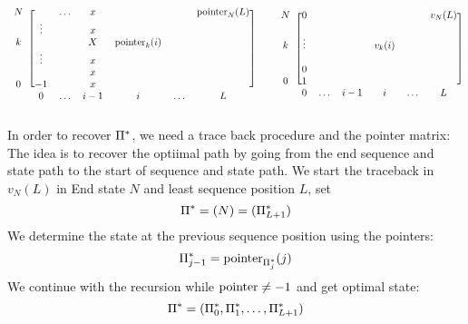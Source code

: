 \begin{definition}
\[
\begin{blockarray}{ccccccc}
\begin{block}{c[cccccc]}
N      &        & \hdots & x &               &        &  \pointer_N(L) \\
       & \vdots &        & x &               &        &             \\
k      &        &        & X & \pointer_k(i) &        &  \\
       & \vdots &        & x &               &        &  \\
       &        &        & x &               &        &  \\
0      & -1     &        & x &               &        &  \\
\end{block}
       & 0      & \hdots & i-1 & i & \hdots & L
\end{blockarray}
\qquad
\begin{blockarray}{ccccccc}
\begin{block}{c[cccccc]}
N      & 0      &        &  &        &        &  v_N(L) \\
       &        &        &  &        &        &         \\
k      & \vdots &        &  & v_k(i) &        &  \\
       &        &        &  &        &        &  \\
       & 0      &        &  &        &        &  \\
0      & 1      &        &  &        &        &  \\
\end{block}
       & 0      & \hdots & i-1 & i & \hdots & L
\end{blockarray}
\]



In order to recover \(\Pi^*\), we need a trace back procedure and the pointer
matrix:
The idea is to recover the optiimal path by going from the end sequence and
state path to the start of sequence and state path.
We start the traceback in \(v_N(L)\) in End state \(N\) and least sequence
position \(L\), set
\[
    \Pi^* = (N) = (\Pi^*_{L+1})
\]
We determine the state at the previous sequence position using the pointers:
\[
    \Pi^*_{j-1} = \text{pointer}_{\Pi^*_j} (j)
\]
We continue with the recursion while \(\text{pointer}\neq -1\) and get optimal state:
\[
    \Pi^* = (\Pi^*_0, \Pi^*_1,\dotsc,\Pi^*_{L+1})
\]
\end{definition}

